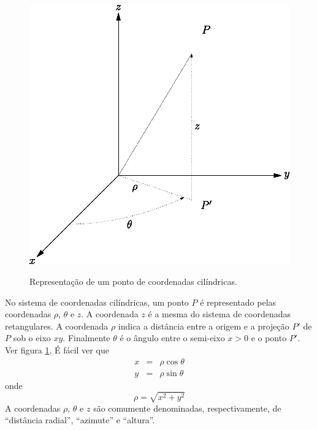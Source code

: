 \begin{figure}%
\begin{center}
   \includegraphics{./cap_algvet/figs/coordenadas_cilindricas}
   \caption{Representação de um ponto de coordenadas cilíndricas.}\label{Coo_cil}
      \label{fig:coordenadas_cilindricas}
      \end{center}
  \end{figure}


No sistema de coordenadas cilíndricas, um ponto $P$ é representado pelas coordenadas $\rho$, $\theta$ e $z$. A coordenada $z$ é a mesma do sistema de coordenadas retangulares. A coordenada $\rho$ indica a distância entre a origem e a projeção $P'$ de $P$ sob o eixo $xy$. Finalmente $\theta$ é o ângulo entre o semi-eixo $x>0$ e o ponto $P'$. Ver figura \ref{fig:coordenadas_cilindricas}. É fácil ver que
\begin{subequations}\label{xphi}
\begin{eqnarray}
x&=&\rho\cos\theta\\
y&=&\rho\sin\theta
\end{eqnarray}
\end{subequations}
onde
\begin{equation}
\rho=\sqrt{x^2+y^2}
\end{equation}
A coordenadas $\rho$, $\theta$ e $z$ são comumente denominadas, respectivamente, de ``distância radial'', ``azimute'' e ``altura''.

